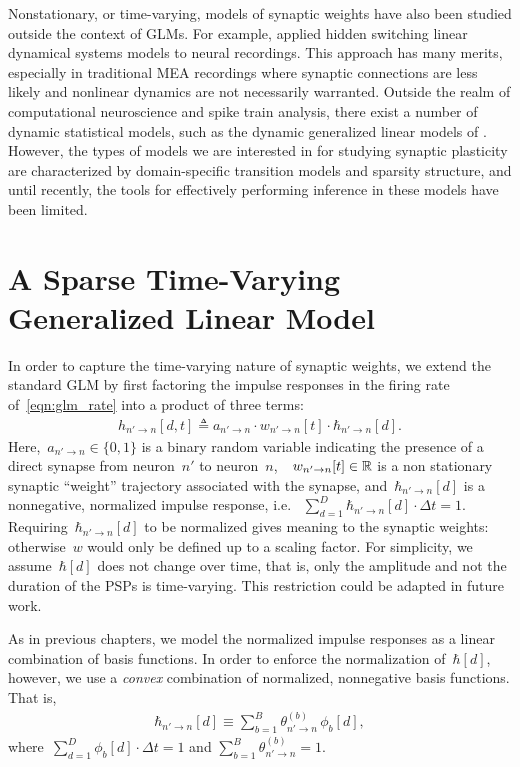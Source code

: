 Nonstationary, or time-varying, models of synaptic weights have also
been studied outside the context of GLMs. For example,
\citet{Petreska-2011} applied hidden switching linear dynamical
systems models to neural recordings. This approach has many merits,
especially in traditional MEA recordings where synaptic connections
are less likely and nonlinear dynamics are not necessarily
warranted. Outside the realm of computational neuroscience and spike
train analysis, there exist a number of dynamic statistical models,
such as the dynamic generalized linear models of \citet{West-1985}.
However, the types of models we are interested in for studying
synaptic plasticity are characterized by domain-specific transition
models and sparsity structure, and until recently, the tools for
effectively performing inference in these models have been limited.


\section{A Sparse Time-Varying Generalized Linear Model}
In order to capture the time-varying nature of synaptic weights, we
extend the standard GLM by first factoring the impulse responses in
the firing rate of~\eqref{eqn:glm_rate} into a product of three
terms:
\begin{align}
\label{eqn:tvwglm_ir}
h_{n' \to n}[d, t] \triangleq a_{n'\to n} \cdot w_{n' \to n}[t] \cdot \hbar_{n' \to n}[d].
\end{align}
Here,~${a_{n'\to n}\in\{0,1\}}$ is a binary random variable indicating
the presence of a direct synapse from neuron~$n'$ to
neuron~$n$,~~${w_{n'\to n}[t] \in \mathbb{R}}$ is a non stationary
synaptic ``weight'' trajectory associated with the synapse, and~$\hbar_{n'
  \to n}[d]$ is a nonnegative, normalized impulse response,
i.e. ~${\sum_{d=1}^D \hbar_{n' \to n}[d] \cdot \Delta t =
  1}$. Requiring~${\hbar_{n' \to n}[d]}$ to be normalized gives
meaning to the synaptic weights: otherwise~$w$ would only be defined
up to a scaling factor. For simplicity, we assume~$\hbar[d]$ does
not change over time, that is, only the amplitude and not the duration
of the PSPs is time-varying. This restriction could be adapted in
future work.

As in previous chapters, we model the normalized impulse responses as
a linear combination of basis functions. In order to enforce the
normalization of~$\hbar[d]$, however, we use a \emph{convex}
combination of normalized, nonnegative basis functions. That is,
\begin{align*}
\hbar_{n' \to n}[d] \equiv \sum_{b=1}^B \theta_{n' \to n}^{(b)}\, \phi_b[d],
\end{align*}
where~${\sum_{d=1}^D \phi_b[d] \cdot \Delta t = 1}$ and
${\sum_{b=1}^B \theta_{n' \to n}^{(b)} = 1}$. 

